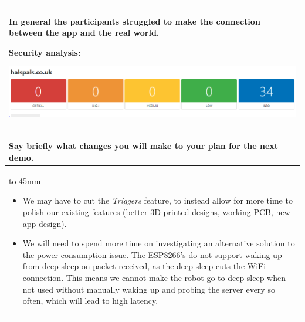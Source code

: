 \documentclass[a4paper]{article}
\newcommand{\colWidth}{141mm}
\begin{document}
\begin{center}
\begin{tabular}{|p{\colWidth}|}
{		In general the participants struggled to make the connection between the app and the real world. 

		\vspace{3mm}

		Security analysis:
		
		\includegraphics[width=\linewidth]{image.png}
  }
  \\
  \hline
\end{tabular}
\vskip 5mm


\begin{tabular}{|p{\colWidth}|}
	\hline
	\cellcolor{blue!25}\large
	\textbf{Say briefly what changes you will make to your plan for the next demo.}
	\\ \hline
	\vtop to 45mm{
		\begin{itemize}
		\item We may have to cut the \textit{Triggers} feature, to instead allow for more time to polish our existing features (better 3D-printed designs, working PCB, new app design).
	
		\item We will need to spend more time on investigating an alternative solution to the power consumption issue. The ESP8266's do not
		support waking up from deep sleep on packet received, as the deep sleep cuts the WiFi connection.
		This means we cannot make the robot go to deep sleep when not used without manually waking up and
		probing the server every so often, which will lead to high latency.

		\end{itemize}
		
  	}
  \\
  \hline
\end{tabular}

\end{center}
  
\end{document}
